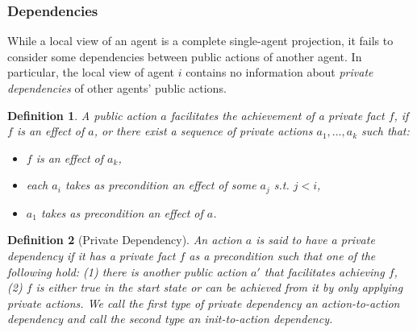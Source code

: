 \documentclass[letterpaper]{article}
\newcommand{\public}{\textit{public}}
\newtheorem{definition}{Definition}
\theoremstyle{definition}
\begin{document}



\subsubsection{Dependencies}

While a local view of an agent is a complete single-agent projection, it fails to consider some dependencies between public actions of another agent. In particular, the local view of agent $i$ contains no information about {\em private dependencies} of other agents' public actions. %


\begin{definition}
A public action $a$ {\em facilitates} the achievement of a private fact $f$, if $f$ is an effect of $a$, or there exist a sequence of private actions $a_1,...,a_k$ such that:
\begin{itemize}
\item $f$ is an effect of $a_k$,
\item each $a_i$ takes as precondition an effect of some $a_j$ s.t. $j<i$,
\item $a_1$ takes as precondition an effect of $a$.
\end{itemize}
\end{definition}

\begin{definition}[Private Dependency]
An action $a$ is said to have a private dependency if it has a private fact $f$ as a precondition such that one of the following hold: (1) there is another public action $a'$ that facilitates achieving $f$,  (2) $f$ is either true in the start state or can be achieved from it by only applying private actions. We call the first type of private dependency an action-to-action dependency and call the second type an init-to-action dependency. 
\label{def:private-dependency}
\end{definition}
\end{document}
